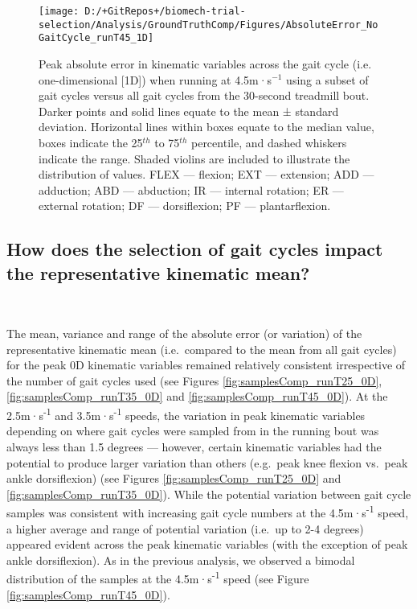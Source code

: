 \documentclass[]{elsarticle} %
\begin{document}
\begin{figure}

{\centering \texttt{[image: D:/+GitRepos+/biomech-trial-selection/Analysis/GroundTruthComp/Figures/AbsoluteError\_NoGaitCycle\_runT45\_1D]} 

}

\caption{Peak absolute error in kinematic variables across the gait cycle (i.e. one-dimensional [1D]) when running at 4.5m·s$^{-1}$ using a subset of gait cycles versus all gait cycles from the 30-second treadmill bout. Darker points and solid lines equate to the mean ± standard deviation. Horizontal lines within boxes equate to the median value, boxes indicate the 25$^{th}$ to 75$^{th}$ percentile, and dashed whiskers indicate the range. Shaded violins are included to illustrate the distribution of values. FLEX — flexion; EXT — extension; ADD — adduction; ABD — abduction; IR — internal rotation; ER — external rotation; DF — dorsiflexion; PF — plantarflexion.}\label{fig:groundTruthError_runT45_1D}
\end{figure}

\hypertarget{how-does-the-selection-of-gait-cycles-impact-the-representative-kinematic-mean}{%
\subsection{How does the selection of gait cycles impact the
representative kinematic
mean?}\label{how-does-the-selection-of-gait-cycles-impact-the-representative-kinematic-mean}}

~

The mean, variance and range of the absolute error (or variation) of the
representative kinematic mean (i.e.~compared to the mean from all gait
cycles) for the peak 0D kinematic variables remained relatively
consistent irrespective of the number of gait cycles used (see Figures
\ref{fig:samplesComp_runT25_0D}, \ref{fig:samplesComp_runT35_0D} and
\ref{fig:samplesComp_runT45_0D}). At the 2.5m·s\textsuperscript{-1} and
3.5m·s\textsuperscript{-1} speeds, the variation in peak kinematic
variables depending on where gait cycles were sampled from in the
running bout was always less than 1.5 degrees --- however, certain
kinematic variables had the potential to produce larger variation than
others (e.g.~peak knee flexion vs.~peak ankle dorsiflexion) (see Figures
\ref{fig:samplesComp_runT25_0D} and \ref{fig:samplesComp_runT35_0D}).
While the potential variation between gait cycle samples was consistent
with increasing gait cycle numbers at the 4.5m·s\textsuperscript{-1}
speed, a higher average and range of potential variation (i.e.~up to 2-4
degrees) appeared evident across the peak kinematic variables (with the
exception of peak ankle dorsiflexion). As in the previous analysis, we
observed a bimodal distribution of the samples at the
4.5m·s\textsuperscript{-1} speed (see Figure
\ref{fig:samplesComp_runT45_0D}).
\end{document}
